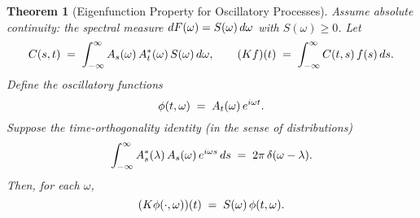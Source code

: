 \documentclass{article}
\newtheorem{theorem}{Theorem}
\begin{document}
\begin{theorem}[Eigenfunction Property for Oscillatory Processes]
  Assume absolute continuity: the spectral measure $dF (\omega) = S (\omega) 
  \hspace{0.17em} d \omega$ with $S (\omega) \ge 0$. Let
  \begin{equation}
    C (s, t) \hspace{0.27em} = \hspace{0.27em} \int_{- \infty}^{\infty} A_s
    (\omega)  \hspace{0.17em} A_t^{\ast} (\omega)  \hspace{0.17em} S (\omega) 
    \hspace{0.17em} d \omega, \qquad (Kf) (t) \hspace{0.27em} =
    \hspace{0.27em} \int_{- \infty}^{\infty} C (t, s)  \hspace{0.17em} f (s) 
    \hspace{0.17em} ds.
  \end{equation}
  Define the oscillatory functions
  \begin{equation}
    \phi (t, \omega) \hspace{0.27em} = \hspace{0.27em} A_t (\omega) 
    \hspace{0.17em} e^{i \omega t} .
  \end{equation}
  Suppose the time-orthogonality identity (in the sense of distributions)
  \begin{equation}
    \label{eq:time-orth} \int_{- \infty}^{\infty} A_s^{\ast} (\lambda) 
    \hspace{0.17em} A_s (\omega)  \hspace{0.17em} e^{i \omega s} 
    \hspace{0.17em} ds \hspace{0.27em} = \hspace{0.27em} 2 \pi \hspace{0.17em}
    \delta (\omega - \lambda) .
  \end{equation}
  Then, for each $\omega$,
  \begin{equation}
    \label{eq:Kphi-eig} (K \phi (\cdot, \omega)) (t) \hspace{0.27em} =
    \hspace{0.27em} S (\omega)  \hspace{0.17em} \phi (t, \omega) .
  \end{equation}
\end{theorem}
\end{document}

